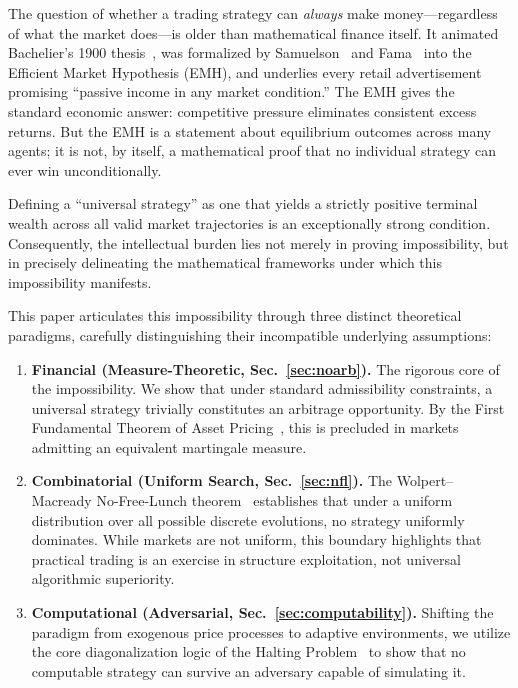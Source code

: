 \documentclass[aps,pra,reprint,superscriptaddress,amsmath,amssymb]{revtex4-2}
\theoremstyle{plain}
\theoremstyle{definition}
\theoremstyle{remark}
\begin{document}
The question of whether a trading strategy can \emph{always} make money---regardless
of what the market does---is older than mathematical finance itself. It animated
Bachelier's 1900 thesis~\cite{Bachelier1900}, was formalized by Samuelson~\cite{Samuelson1965}
and Fama~\cite{Fama1970} into the Efficient Market Hypothesis (EMH), and underlies
every retail advertisement promising ``passive income in any market condition.''
The EMH gives the standard economic answer: competitive pressure eliminates
consistent excess returns. But the EMH is a statement about equilibrium outcomes
across many agents; it is not, by itself, a mathematical proof that no individual
strategy can ever win unconditionally.

Defining a ``universal strategy'' as one that yields a strictly positive terminal wealth across all valid market trajectories is an exceptionally strong condition. Consequently, the intellectual burden lies not merely in proving impossibility, but in precisely delineating the mathematical frameworks under which this impossibility manifests.

This paper articulates this impossibility through three distinct theoretical paradigms, carefully distinguishing their incompatible underlying assumptions:

\begin{enumerate}
  \item \textbf{Financial (Measure-Theoretic, Sec.~\ref{sec:noarb}).} The rigorous core of the impossibility. We show that under standard admissibility constraints, a universal strategy trivially constitutes an arbitrage opportunity. By the First Fundamental Theorem of Asset Pricing~\cite{Harrison1981,Delbaen1994}, this is precluded in markets admitting an equivalent martingale measure.

  \item \textbf{Combinatorial (Uniform Search, Sec.~\ref{sec:nfl}).} The Wolpert--Macready No-Free-Lunch theorem~\cite{Wolpert:1997:NFL:2221336.2221408} establishes that under a uniform distribution over all possible discrete evolutions, no strategy uniformly dominates. While markets are not uniform, this boundary highlights that practical trading is an exercise in structure exploitation, not universal algorithmic superiority.

  \item \textbf{Computational (Adversarial, Sec.~\ref{sec:computability}).} Shifting the paradigm from exogenous price processes to adaptive environments, we utilize the core diagonalization logic of the Halting Problem~\cite{turing-36} to show that no computable strategy can survive an adversary capable of simulating it.
\end{enumerate}
\end{document}
